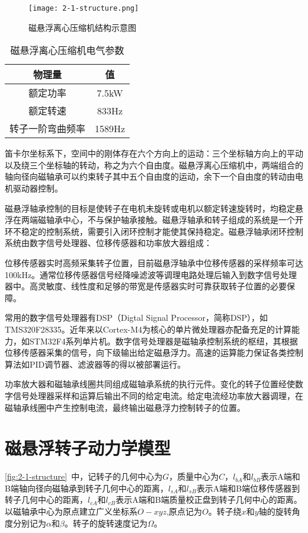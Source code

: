\documentclass[
  lang=cn,
  degree=master,
  openany,oneside
]{nuaathesis}
\begin{document}
\begin{figure}[h!]
	\texttt{[image: 2-1-structure.png]}
	\caption{磁悬浮离心压缩机结构示意图}
	\label{fig:2-1-structure}
\end{figure}

\begin{table}[h!]
  \caption[磁悬浮离心压缩机电气参数]{磁悬浮离心压缩机电气参数\label{tab:motor_para}}
  \begin{tabular}{cc}
    \toprule
    物理量 & 值 \\
    \midrule
    额定功率 & 7.5kW\\
    额定转速 & 833Hz\\
    转子一阶弯曲频率 & 1589Hz\\
    \bottomrule
  \end{tabular}
\end{table}

笛卡尔坐标系下，空间中的刚体存在六个方向上的运动：三个坐标轴方向上的平动以及绕三个坐标轴的转动，称之为六个自由度。磁悬浮离心压缩机中，两端组合的轴向径向磁轴承可以约束转子其中五个自由度的运动，余下一个自由度的转动由电机驱动器控制。

磁悬浮轴承控制的目标是使转子在电机未旋转或电机以额定转速旋转时，均稳定悬浮在两端磁轴承中心，不与保护轴承接触。磁悬浮轴承和转子组成的系统是一个开环不稳定的控制系统，需要引入闭环控制才能使其保持稳定。磁悬浮轴承闭环控制系统由数字信号处理器、位移传感器和功率放大器组成：

位移传感器实时高频采集转子位置，目前磁悬浮轴承中位移传感器的采样频率可达100kHz。通常位移传感器信号经降噪滤波等调理电路处理后输入到数字信号处理器中。高灵敏度、线性度和足够的带宽是传感器实时可靠获取转子位置的必要保障。

常用的数字信号处理器有DSP（Digtal Signal Processor，简称DSP），如TMS320F28335。近年来以Cortex-M4为核心的单片微处理器亦配备充足的计算能力，如STM32F4系列单片机。数字信号处理器是磁轴承控制系统的枢纽，其根据位移传感器采集的信号，向下级输出给定磁悬浮力。高速的运算能力保证各类控制算法如PID调节器、滤波器等的得以被部署运行。

功率放大器和磁轴承线圈共同组成磁轴承系统的执行元件。变化的转子位置经使数字信号处理器采样和运算后输出不同的给定电流。给定电流经功率放大器调理，在磁轴承线圈中产生控制电流，最终输出磁悬浮力控制转子的位置。

\section{磁悬浮转子动力学模型}
\autoref{fig:2-1-structure}~中，记转子的几何中心为$ G $，质量中心为$ C $，$ l_{bA} $和$ l_{bB} $表示A端和B端轴向径向磁轴承到转子几何中心的距离，$ l_{sA} $和$ l_{sB} $表示A端和B端位移传感器到转子几何中心的距离，$ l_{cA} $和$ l_{cB} $表示A端和B端质量校正盘到转子几何中心的距离。以磁轴承中心为原点建立广义坐标系$ O-xyz $,原点记为$ O $。转子绕$ x $和$ y $轴的旋转角度分别记为$ \alpha $和$ \beta $。转子的旋转速度记为$ \Omega $。
\end{document}
